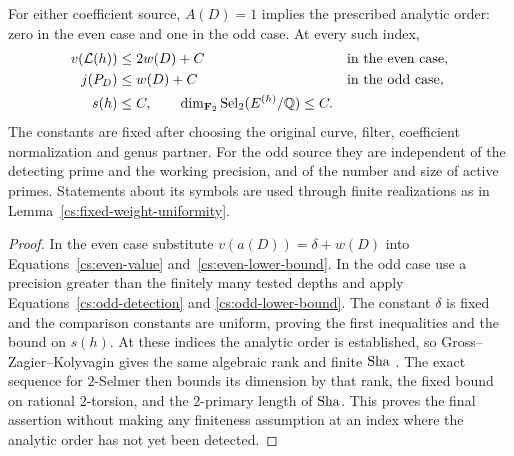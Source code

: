 \begin{proposition}
\label{prop:unit-symbol-detection}
For either coefficient source, $A(D)=1$ implies the prescribed analytic
order: zero in the even case and one in the odd case.  At every such
index,
\begin{align}
 v({\cal L}(h))&\leq2w(D)+C &&\text{in the even case},
 \label{cs:even-sharp}\\
 j(P_D)&\leq w(D)+C &&\text{in the odd case},
 \label{cs:odd-sharp}\\
 s(h)&\leq C,\qquad \dim_{\mathbf F_2}\operatorname{Sel}_2(E^{(h)}/\mathbb Q)\leq C.
 \label{cs:unit-selmer-bound}
\end{align}
The constants are fixed after choosing the original curve, filter,
coefficient normalization and genus partner.  For the odd source they
are independent of the detecting prime and the working precision, and
of the number and size of active primes.  Statements about its symbols
are used through finite realizations as in
Lemma~\ref{cs:fixed-weight-uniformity}.
\end{proposition}

\begin{proof}
In the even case substitute $v(a(D))=\delta+w(D)$ into
Equations~\eqref{cs:even-value} and~\eqref{cs:even-lower-bound}.
In the odd case use a precision greater than the finitely many tested
depths and apply Equations~\eqref{cs:odd-detection} and
\eqref{cs:odd-lower-bound}.  The constant $\delta$ is fixed and the
comparison constants are uniform, proving the first inequalities and
the bound on $s(h)$.  At these indices the analytic order is established,
so Gross--Zagier--Kolyvagin gives the same algebraic rank and finite
$\operatorname{Sha}$ \citep{GrossZagier1986,Kolyvagin1990}.  The exact sequence for $2$-Selmer then bounds its dimension
by that rank, the fixed bound on rational $2$-torsion, and the
$2$-primary length of $\operatorname{Sha}$.  This proves the final assertion without
making any finiteness assumption at an index where the analytic order
has not yet been detected.
\end{proof}
